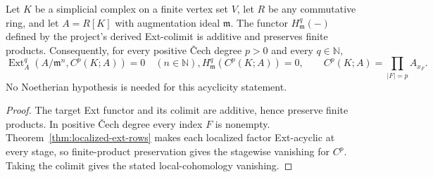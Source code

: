 \begin{theorem}\label{thm:cech-acyclic-terms}
Let $K$ be a simplicial complex on a finite vertex set $V$, let $R$ be any
commutative ring, and let $A=R[K]$ with augmentation ideal $\mathfrak m$.
The functor $H^q_{\mathfrak m}(-)$ defined by the project's derived
Ext-colimit is additive and preserves finite products. Consequently, for
every positive Čech degree $p>0$ and every $q\in\mathbb N$,
\[
  \operatorname{Ext}^q_A(A/\mathfrak m^n,C^p(K;A))=0\quad(n\in\mathbb N),
  H^q_{\mathfrak m}(C^p(K;A))=0,
  \qquad C^p(K;A)=\prod_{|F|=p} A_{x_F}.
\]
No Noetherian hypothesis is needed for this acyclicity statement.
\leanok
\end{theorem}
\begin{proof}
The target Ext functor and its colimit are additive, hence preserve finite
products. In positive Čech degree every index $F$ is nonempty.
Theorem~\ref{thm:localized-ext-rows} makes each localized factor Ext-acyclic
at every stage, so finite-product preservation gives the stagewise vanishing
for $C^p$. Taking the colimit gives the stated local-cohomology vanishing.
\end{proof}

